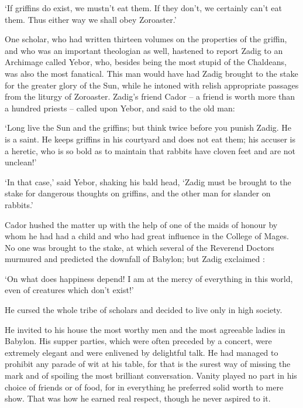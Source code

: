 \documentclass{article}
\begin{document}
\begin{center}
`If griffins do exist, we mustn't eat them. If they don't, we certainly can't eat 
them. Thus either way we shall obey Zoroaster.' 

One scholar, who had written thirteen volumes on the properties of the griffin, 
and who was an important theologian as well, hastened to report Zadig to an Archimage 
called Yebor, who, besides being the most stupid of the Chaldeans, was also the 
most fanatical. This man would have had Zadig brought to the stake for the greater 
glory of the Sun, while he intoned with relish appropriate passages from the liturgy 
of Zoroaster. Zadig's friend Cador – a friend is worth more than a hundred priests 
– called upon Yebor, and said to the old man: 

`Long live the Sun and the griffins; but think twice before you punish Zadig. He 
is a saint. He keeps griffins in his courtyard and does not eat them; his accuser 
is a heretic, who is so bold as to maintain that rabbits have cloven feet and are 
not unclean!' 

`In that case,' said Yebor, shaking his bald head, `Zadig must be brought to the 
stake for dangerous thoughts on griffins, and the other man for slander on rabbits.' 

Cador hushed the matter up with the help of one of the maids of honour by whom 
he had had a child and who had great influence in the College of Mages. No one 
was brought to the stake, at which several of the Reverend Doctors murmured and 
predicted the downfall of Babylon; but Zadig exclaimed : 

`On what does happiness depend! I am at the mercy of everything in this world, 
even of creatures which don't exist!' 

He cursed the whole tribe of scholars and decided to live only in high society. 

He invited to his house the most worthy men and the most agreeable ladies in Babylon. 
His supper parties, which were often preceded by a concert, were extremely elegant 
and were enlivened by delightful talk. He had managed to prohibit any parade of 
wit at his table, for that is the surest way of missing the mark and of spoiling 
the most brilliant conversation. Vanity played no part in his choice of friends 
or of food, for in everything he preferred solid worth to mere show. That was how 
he earned real respect, though he never aspired to it. 


\end{center}
\end{document}
